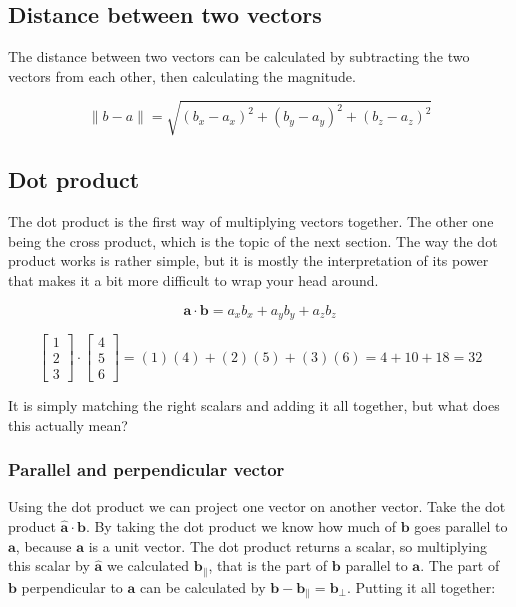 \documentclass[11pt]{article}
\begin{document}
\subsection{Distance between two vectors}

The distance between two vectors can be calculated by subtracting the two vectors from each other, then calculating the magnitude.

$$\|b-a\|=\sqrt{(b_x-a_x)^2+(b_y-a_y)^2+(b_z-a_z)^2}$$

\subsection{Dot product}

The dot product is the first way of multiplying vectors together. The other one being the cross product, which is the topic of the next section. The way the dot product works is rather simple, but it is mostly the interpretation of its power that makes it a bit more difficult to wrap your head around.

$$\textbf{a}\cdot\textbf{b}=a_xb_x+a_yb_y+a_zb_z$$

$$
\begin{bmatrix}
1 \\ 2 \\ 3
\end{bmatrix} \cdot
\begin{bmatrix}
4 \\ 5 \\ 6
\end{bmatrix}=(1)(4)+(2)(5)+(3)(6)=4+10+18=32
$$

It is simply matching the right scalars and adding it all together, but what does this actually mean?

\subsubsection{Parallel and perpendicular vector}

Using the dot product we can project one vector on another vector. Take the dot product $\hat{\textbf{a}}\cdot\textbf{b}$. By taking the dot product we know how much of $\textbf{b}$ goes parallel to $\textbf{a}$, because $\textbf{a}$ is a unit vector. The dot product returns a scalar, so multiplying this scalar by $\hat{\textbf{a}}$ we calculated $\textbf{b}_\|$, that is the part of $\textbf{b}$ parallel to $\textbf{a}$. The part of $\textbf{b}$ perpendicular to $\textbf{a}$ can be calculated by $\textbf{b}-\textbf{b}_\|=\textbf{b}_\perp$. Putting it all together:
\end{document}
